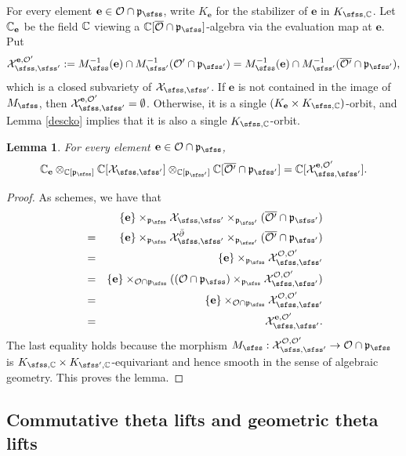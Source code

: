 \documentclass[12pt,a4paper]{amsart}
\newcommand{\CO}{{\mathcal {O}}}
\newcommand{\CX}{{\mathcal {X}}}
\newcommand{\p}{\mathfrak p}
\numberwithin{equation}{section}
\newtheorem{lem}[thm]{Lemma}
\theoremstyle{remark}
\begin{document}
For every element $\mathbf e\in \CO\cap \p_\sfss$, write $K_\mathbf e$ for the stabilizer of $\mathbf e$ in $K_{\sfss, \C}$. Let $\mathbb{C}_\mathbf e$ be the field $\mathbb{C}$ viewing a  $\C[\overline \CO\cap \p_\sfss]$-algebra via the evaluation map at $\mathbf e$. Put
\[
  \CX_{\sfss, \sfss'}^{\mathbf e, \CO'}:=M_\sfss^{-1}(\mathbf e)\cap M_{\sfss'}^{-1}(\CO'\cap\p_{\sfss'})=M_\sfss^{-1}(\mathbf e)\cap M_{\sfss'}^{-1}(\overline{\CO'}\cap\p_{\sfss'}),
\]
which is a closed subvariety of $\CX_{\sfss, \sfss'}$. If $\mathbf e$ is not contained in the image of $M_\sfss$, then $\CX_{\sfss, \sfss'}^{\mathbf e, \CO'}=\emptyset$. Otherwise, it is a single
$(K_\mathbf e\times K_{\sfss,\C})$-orbit, and Lemma \ref{descko} implies that it is also a single $K_{\sfss,\C}$-orbit.
\begin{lem}\label{fiber111}
For every element $\mathbf e\in \CO\cap \p_\sfss$,
\[
  \C_\mathbf e \otimes_{\C[\p_{\sfss}]} \C[\CX_{\sfss, \sfss'}]\otimes_{\C[\p_{\sfss'}]} \C[\overline{\CO'}\cap \p_{\sfss'}]=\C[\CX_{\sfss, \sfss'}^{\mathbf e, \CO'}].
\]
\end{lem}
\begin{proof}
As schemes, we have that
\begin{eqnarray*}
  &&\{\mathbf e\}\times_{\p_\sfss}{\CX_{\sfss, \sfss'}}\times_{\p_{\sfss'}} (\overline{\CO'}\cap \p_{\sfss'})\\
  &=& \{\mathbf e\}\times_{\p_\sfss}{\CX^{\bar \partial}_{\sfss, \sfss'}}\times_{\p_{\sfss'}} (\overline{\CO'}\cap \p_{\sfss'})\\
    &=& \{\mathbf e\}\times_{\p_\sfss}   \CX_{\sfss, \sfss'}^{\CO, \CO'}\\
    &=& \{\mathbf e\} \times_{\CO\cap \p_\sfss} ( (\CO\cap \p_\sfss) \times_{\p_\sfss} \CX_{\sfss, \sfss'}^{\CO, \CO'})\\
     &=& \{\mathbf e\} \times_{\CO\cap \p_\sfss} \CX_{\sfss, \sfss'}^{\CO, \CO'}\\
   &=& \CX_{\sfss, \sfss'}^{\mathbf e, \CO'}.
\end{eqnarray*}
The last equality holds because the morphism $M_\sfss: \CX_{\sfss, \sfss'}^{\CO, \CO'}\rightarrow \CO\cap \p_\sfss$  is  $K_{\sfss, \C}\times K_{\sfss',\C}$-equivariant and hence smooth in the sense of algebraic geometry. This proves the lemma.
\end{proof}



\subsection{Commutative theta lifts and  geometric theta lifts}
\end{document}
